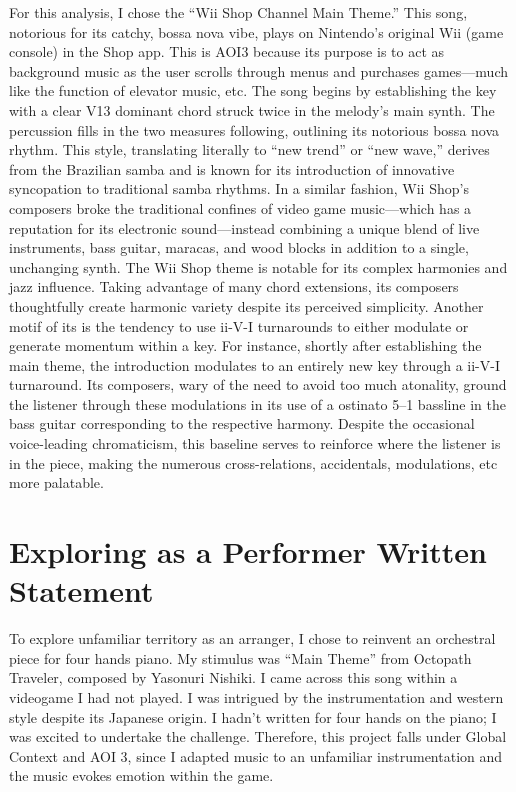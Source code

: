 \documentclass[11pt,a4paper]{article}
\begin{document}
For this analysis, I chose the “Wii Shop Channel Main Theme.” This song, notorious for its catchy, bossa nova vibe, plays on Nintendo’s original Wii (game console) in the Shop app. This is AOI3 because its purpose is to act as background music as the user scrolls through menus and purchases games---much like the function of elevator music, etc.
    The song begins by establishing the key with a clear V13 dominant chord struck twice in the melody’s main synth. The percussion fills in the two measures following, outlining its notorious bossa nova rhythm. This style, translating literally to “new trend” or “new wave,” derives from the Brazilian samba and is known for its introduction of innovative syncopation to traditional samba rhythms. In a similar fashion, Wii Shop’s composers broke the traditional confines of video game music---which has a reputation for its electronic sound---instead combining a unique blend of live instruments, bass guitar, maracas, and wood blocks in addition to a single, unchanging synth.
    The Wii Shop theme is notable for its complex harmonies and jazz influence. Taking advantage of many chord extensions, its composers thoughtfully create harmonic variety despite its perceived simplicity. Another motif of its is the tendency to use ii-V-I turnarounds to either modulate or generate momentum within a key. For instance, shortly after establishing the main theme, the introduction modulates to an entirely new key through a ii-V-I turnaround. Its composers, wary of the need to avoid too much atonality, ground the listener through these modulations in its use of a ostinato 5--1 bassline in the bass guitar corresponding to the respective harmony. Despite the occasional voice-leading chromaticism, this baseline serves to reinforce where the listener is in the piece, making the numerous cross-relations, accidentals, modulations, etc more palatable.\autocite{wiishop}
    
\section{Exploring as a Performer Written Statement}

To explore unfamiliar territory as an arranger, I chose to reinvent an orchestral piece for four hands piano. My stimulus was “Main Theme” from Octopath Traveler, composed by Yasonuri Nishiki. I came across this song within a videogame I had not played. I was intrigued by the instrumentation and western style despite its Japanese origin. I hadn’t written for four hands on the piano; I was excited to undertake the challenge. Therefore, this project falls under Global Context and AOI 3, since I adapted music to an unfamiliar instrumentation and the music evokes emotion within the game. 
\end{document}
